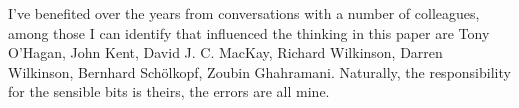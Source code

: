 \documentclass[a4paperpaper,]{article}
\begin{document}
I've benefited over the years from conversations with a number of
colleagues, among those I can identify that influenced the thinking in
this paper are Tony O'Hagan, John Kent, David J. C. MacKay, Richard
Wilkinson, Darren Wilkinson, Bernhard Schölkopf, Zoubin Ghahramani.
Naturally, the responsibility for the sensible bits is theirs, the
errors are all mine.



\end{document}
